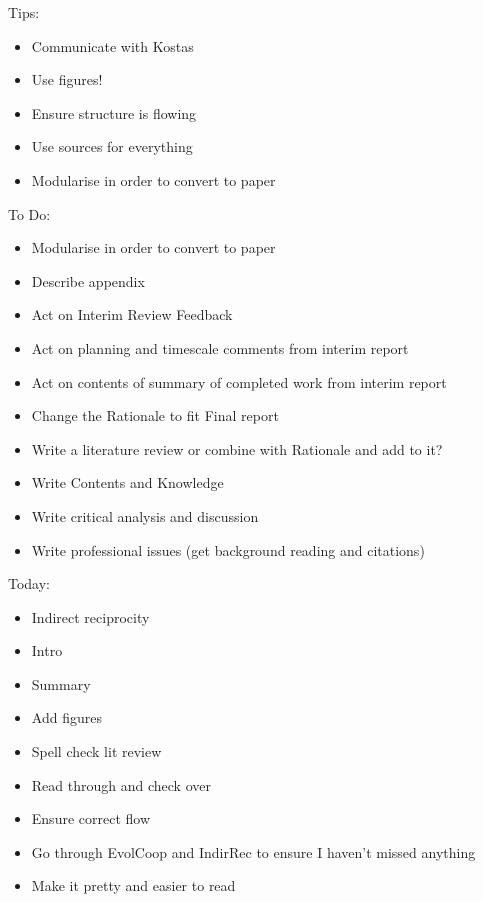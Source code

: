 \documentclass[]{final_report}
\begin{document}
Tips:\begin{itemize}
	\item Communicate with Kostas
	\item Use figures!
	\item Ensure structure is flowing
	\item Use sources for everything
	\item Modularise in order to convert to paper
\end{itemize}
To Do:
\begin{itemize}
	\item Modularise in order to convert to paper
	\item Describe appendix
	\item Act on Interim Review Feedback
	\item Act on planning and timescale comments from interim report
	\item Act on contents of summary of completed work from interim report
	\item Change the Rationale to fit Final report
	\item Write a literature review or combine with Rationale and add to it?
	\item Write Contents and Knowledge
	\item Write critical analysis and discussion
	\item Write professional issues (get background reading and citations)
\end{itemize}
Today:
\begin{itemize}
 	\item Indirect reciprocity
	\item Intro
	\item Summary
	\item Add figures
	\item Spell check lit review
	\item Read through and check over
	\item Ensure correct flow
	\item Go through EvolCoop and IndirRec to ensure I haven't missed anything
	\item Make it pretty and easier to read
\end{itemize}
	
\maketitle

\end{document}
